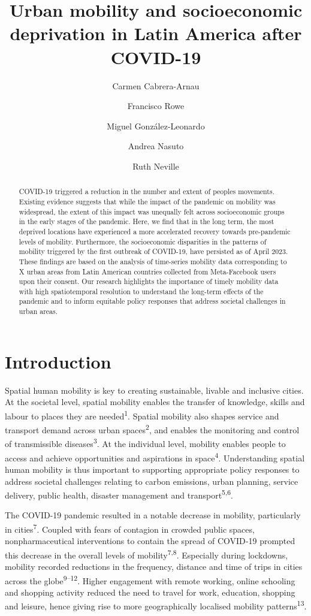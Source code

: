 \documentclass[
  11pt,
]{article}
\title{\textbf{Urban mobility and socioeconomic deprivation in Latin
America after COVID-19}}
\author[1]{Carmen Cabrera-Arnau}
\author[1]{Francisco Rowe}
\author[2]{Miguel González-Leonardo}
\author[1]{Andrea Nasuto}
\author[1]{Ruth Neville}
\affil[1]{Geographic Data Science Lab, Department of Geography and
Planning, University of Liverpool, Liverpool, UK}
\affil[2]{Centre for Demographic Urban and Environmental Studies, El
Colegio de México, Ciudad de México, México}
\date{}
\begin{document}
\maketitle
\begin{abstract}
COVID-19 triggered a reduction in the number and extent of peoples
movements. Existing evidence suggests that while the impact of the
pandemic on mobility was widespread, the extent of this impact was
unequally felt across socioeconomic groups in the early stages of the
pandemic. Here, we find that in the long term, the most deprived
locations have experienced a more accelerated recovery towards
pre-pandemic levels of mobility. Furthermore, the socioeconomic
disparities in the patterns of mobility triggered by the first outbreak
of COVID-19, have persisted as of April 2023. These findings are based
on the analysis of time-series mobility data corresponding to X urban
areas from Latin American countries collected from Meta-Facebook users
upon their consent. Our research highlights the importance of timely
mobility data with high spatiotemporal resolution to understand the
long-term effects of the pandemic and to inform equitable policy
responses that address societal challenges in urban areas.
\end{abstract}

\hfill\break

\section{Introduction}\label{sec-intro}

Spatial human mobility is key to creating sustainable, livable and
inclusive cities. At the societal level, spatial mobility enables the
transfer of knowledge, skills and labour to places they are
needed\textsuperscript{1}. Spatial mobility also shapes service and
transport demand across urban spaces\textsuperscript{2}, and enables the
monitoring and control of transmissible diseases\textsuperscript{3}. At
the individual level, mobility enables people to access and achieve
opportunities and aspirations in space\textsuperscript{4}. Understanding
spatial human mobility is thus important to supporting appropriate
policy responses to address societal challenges relating to carbon
emissions, urban planning, service delivery, public health, disaster
management and transport\textsuperscript{5,6}.

The COVID-19 pandemic resulted in a notable decrease in mobility,
particularly in cities\textsuperscript{7}. Coupled with fears of
contagion in crowded public spaces, nonpharmaceutical interventions to
contain the spread of COVID‐19 prompted this decrease in the overall
levels of mobility\textsuperscript{7,8}. Especially during lockdowns,
mobility recorded reductions in the frequency, distance and time of
trips in cities across the globe\textsuperscript{9--12}. Higher
engagement with remote working, online schooling and shopping activity
reduced the need to travel for work, education, shopping and leisure,
hence giving rise to more geographically localised mobility
patterns\textsuperscript{13}.
\end{document}
